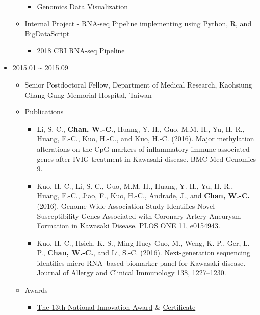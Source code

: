 \documentclass[]{article}
\providecommand{\tightlist}{%
  \setlength{\itemsep}{0pt}\setlength{\parskip}{0pt}}
\begin{document}
\begin{itemize}
\begin{itemize}
    \begin{itemize}
    \tightlist
    \item
      \href{https://goo.gl/Nhq4oW}{Genomics Data Visualization}
    \end{itemize}
  \item
    Internal Project - RNA-seq Pipeline implementing using Python, R,
    and BigDataScript

    \begin{itemize}
    \tightlist
    \item
      \href{https://github.com/wenching/cri_rnaseq_2018/tree/master/docs}{2018
      CRI RNA-seq Pipeline}
    \end{itemize}
  \end{itemize}
\item
  2015.01 \textasciitilde{} 2015.09

  \begin{itemize}
  \tightlist
  \item
    Senior Postdoctoral Fellow, Department of Medical Research,
    Kaohsiung Chang Gung Memorial Hospital, Taiwan
  \item
    Publications

    \begin{itemize}
    \tightlist
    \item
      Li, S.-C., \textbf{Chan, W.-C.}, Huang, Y.-H., Guo, M.M.-H., Yu,
      H.-R., Huang, F.-C., Kuo, H.-C., and Kuo, H.-C. (2016). Major
      methylation alterations on the CpG markers of inflammatory immune
      associated genes after IVIG treatment in Kawasaki disease. BMC Med
      Genomics 9.
    \item
      Kuo, H.-C., Li, S.-C., Guo, M.M.-H., Huang, Y.-H., Yu, H.-R.,
      Huang, F.-C., Jiao, F., Kuo, H.-C., Andrade, J., and \textbf{Chan,
      W.-C.} (2016). Genome-Wide Association Study Identifies Novel
      Susceptibility Genes Associated with Coronary Artery Aneurysm
      Formation in Kawasaki Disease. PLOS ONE 11, e0154943.
    \item
      Kuo, H.-C., Hsieh, K.-S., Ming-Huey Guo, M., Weng, K.-P., Ger,
      L.-P., \textbf{Chan, W.-C.}, and Li, S.-C. (2016). Next-generation
      sequencing identifies micro-RNA--based biomarker panel for
      Kawasaki disease. Journal of Allergy and Clinical Immunology 138,
      1227--1230.
    \end{itemize}
  \item
    Awards

    \begin{itemize}
    \tightlist
    \item
      \href{https://innoaward.taiwan-healthcare.org/AwardDetail.php?REFDOCTYPID=0nimiycqow7g4bru\&NumID=0oixv0ge1k07vc47\&REFDOCID=0oj6w0yr9wyk0k5c}{The
      13th National Innovation Award} \&
      \href{IMG/2016NationalInnovationAwardCertificate.png}{Certificate}
    \end{itemize}
  \end{itemize}
\end{itemize}
\end{document}
